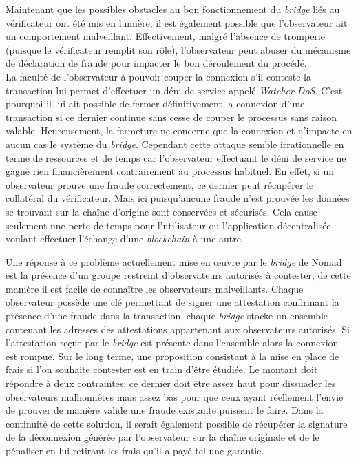 Maintenant que les possibles obstacles au bon fonctionnement du \textit{bridge} liés au vérificateur ont été mis en lumière, il est également possible que l’observateur ait un comportement malveillant.  Effectivement, malgré l’absence de tromperie (puisque le vérificateur remplit son rôle), l’observateur peut abuser du mécanisme de déclaration de fraude pour impacter le bon déroulement du procédé. \\

La faculté de l’observateur à pouvoir couper la connexion s’il conteste la transaction lui permet d’effectuer un déni de service appelé \textit{Watcher DoS}. C’est pourquoi il lui ait possible de fermer définitivement la connexion d’une transaction si ce dernier continue sans cesse de couper le processus sans raison valable. Heureusement, la fermeture ne concerne que la connexion et n’impacte en aucun cas le système du \textit{bridge}. Cependant cette attaque semble irrationnelle en terme de ressources et de temps car l’observateur effectuant le déni de service ne gagne rien financièrement contrairement au processus habituel. En effet, si un observateur prouve une fraude correctement, ce dernier peut récupérer le collatéral du vérificateur. Mais ici puisqu’aucune fraude n’est prouvée les données se trouvant sur la chaîne d’origine sont conservées et sécurisés. Cela cause seulement une perte de temps pour l’utilisateur ou l’application décentralisée voulant effectuer l'échange d’une \textit{\gls{blockchain}} à une autre.

Une réponse à ce problème actuellement mise en œuvre par le \textit{bridge} de Nomad est la présence d’un groupe restreint d’observateurs autorisés à contester, de cette manière il est facile de connaître les observateurs malveillants. Chaque observateur possède une clé permettant de signer une attestation confirmant la présence d’une fraude dans la transaction, chaque \textit{bridge} stocke un ensemble contenant les adresses des attestations appartenant aux observateurs autorisés. Si l’attestation reçue par le \textit{bridge} est présente dans l’ensemble alors la connexion est rompue\cite{NomadDocsWatcher}.
Sur le long terme, une proposition consistant à la mise en place de frais si l’on souhaite contester est en train d’être étudiée. Le montant doit répondre à deux contraintes: ce dernier doit être assez haut pour dissuader les observateurs malhonnêtes mais assez bas pour que ceux ayant réellement l’envie de prouver de manière valide une fraude existante puissent le faire. Dans la continuité de cette solution, il serait également possible de récupérer la signature de la déconnexion générée par l’observateur sur la chaîne originale et de le pénaliser en lui retirant les frais qu’il a payé tel une garantie\cite{OptimisticBhuptani}.

